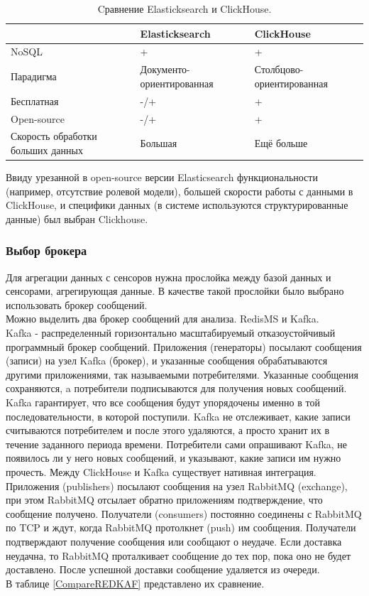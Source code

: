 \begin{table}[H]
\caption{Cравнение Elasticksearch и ClickHouse.}
\begin{center}
\begin{tabular}{ |p{5cm} |p{5cm}|p{5cm} |}
\hline 
 & Elasticksearch & ClickHouse  \\ \hline 
NoSQL & + & + \\ \hline 
Парадигма & Документо-ориентированная & Столбцово-ориентированная \\ \hline 
Бесплатная & -/+ & +  \\ \hline 
Open-source & -/+ & + \\ \hline 
Скорость обработки больших данных & Большая & Ещё больше \\ \hline
\end{tabular}
\end{center}
\label{CompareELCL}
\end{table}

\indent Ввиду урезанной в open-source версии Elasticsearch функциональности (например, отсутствие ролевой модели), большей скорости работы с данными в ClickHouse, и специфики данных (в системе используются структурированные данные) был выбран Clickhouse.
\subsubsection{Выбор брокера}
Для агрегации данных с сенсоров нужна прослойка между базой данных и сенсорами, агрегирующая данные. В качестве такой прослойки было выбрано использовать брокер сообщений.\\
\indent Можно выделить два брокер сообщений для анализа. RedisMS и Kafka. \\
\indent Kafka -  распределенный горизонтально масштабируемый отказоустойчивый программный брокер сообщений. Приложения (генераторы) посылают сообщения (записи) на узел Kafka (брокер), и указанные сообщения обрабатываются другими приложениями, так называемыми потребителями. Указанные сообщения сохраняются, a потребители подписываются для получения новых сообщений. Kafka гарантирует, что все сообщения будут упорядочены именно в той последовательности, в которой поступили. Kafka не отслеживает, какие записи считываются потребителем и после этого удаляются, а просто хранит их в течение заданного периода времени. Потребители сами опрашивают Kafka, не появилось ли у него новых сообщений, и указывают, какие записи им нужно прочесть\cite{kafka-redis}. Между ClickHouse и Kafka существует нативная интеграция.\\
\indent
Приложения (publishers) посылают сообщения на узел RabbitMQ (exchange), при этом RabbitMQ отсылает обратно приложениям подтверждение, что сообщение получено. Получатели (consumers) постоянно соединены с RabbitMQ по TCP и ждут, когда RabbitMQ протолкнет (push) им сообщения. Получатели подтверждают получение сообщения или сообщают о неудаче. Если доставка неудачна, то RabbitMQ проталкивает сообщение до тех пор, пока оно не будет доставлено. После успешной доставки сообщение удаляется из очереди\cite{kafka-redis}. \\
\indent В таблице \ref{CompareREDKAF} представлено их сравнение.

